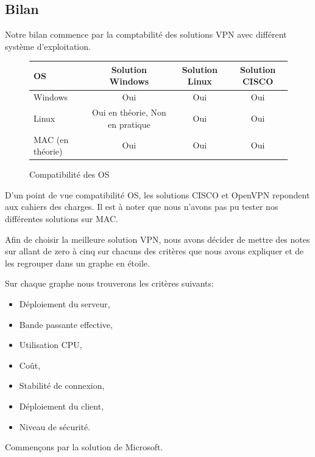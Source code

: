 \subsection{Bilan}

Notre bilan commence par la comptabilité des solutions VPN avec différent système d'exploitation.

\begin{figure}[H]
	\begin{center}
\begin{tabular}{|l|c|c|c|}
\hline
OS & Solution Windows & Solution Linux & Solution CISCO \\
\hline
Windows & Oui & Oui & Oui \\
Linux & Oui en théorie, Non en pratique & Oui & Oui \\
MAC (en théorie) & Oui & Oui & Oui \\
\hline
\end{tabular}
	\end{center}
	\caption{Compatibilité des OS}
	\label{Compatibilité_des_OS}
\end{figure}

D'un point de vue compatibilité OS, les solutions CISCO et OpenVPN repondent aux cahiers des charges. Il est à noter que nous n'avons pas pu tester nos différentes solutions sur MAC.

Afin de choisir la meilleure solution VPN, nous avons décider de mettre des notes sur allant de zero à cinq sur chacuns des critères que nous avons expliquer et de les regrouper dans un graphe en étoile.

Sur chaque graphe nous trouverons les critères suivants:
\begin{itemize}
 	\item Déploiement du serveur,
 	\item Bande passante effective,
 	\item Utilisation CPU,
 	\item Coût,
 	\item Stabilité de connexion,
 	\item Déploiement du client,
	\item Niveau de sécurité.
\end{itemize}



Commençons par la solution de Microsoft.



